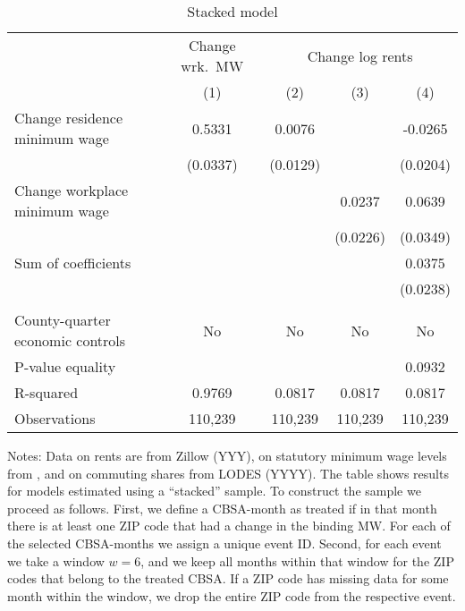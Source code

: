 \begin{table}[hbt!] \centering
	\caption{Stacked model}
	\label{tab:stacked_w6}
	\begin{tabular}{l*{4}{c}}
		\toprule
		& \multicolumn{1}{c}{Change wrk.\ MW}
		& \multicolumn{3}{c}{Change log rents}                            \\ \cmidrule(lr){2-2}\cmidrule(lr){3-5}
		                                   & (1)   & (2)   & (3)   & (4)      \\ \midrule
		Change residence minimum wage      &  0.5331  &  0.0076  &       &  -0.0265     \\
		                                   & (0.0337) & (0.0129) &       & (0.0204)    \\
		Change workplace minimum wage      &       &       &  0.0237  & 0.0639      \\
		                                   &       &       & (0.0226) & (0.0349)    \\ \midrule
		Sum of coefficients                &       &       &       &  0.0375     \\
		                                   &       &       &       & (0.0238)    \\
		                                   &       &       &       &          \\ \midrule
		County-quarter economic controls   &   No  & No    & No    & No       \\
		P-value equality                   &       &       &       & 0.0932      \\
		R-squared                          &  0.9769  &  0.0817  &  0.0817  & 0.0817      \\
		Observations                       & 110,239  & 110,239  & 110,239  & 110,239     \\\bottomrule
	\end{tabular}
    
    \begin{minipage}{.95\textwidth} \footnotesize
        \vspace{2mm}
        Notes: Data on rents are from Zillow (YYY), on statutory minimum wage levels
        from \textcite{VaghulZipperer2016, BerkeleyLaborCenter}, and on commuting 
        shares from LODES (YYYY).
        The table shows results for models estimated using a ``stacked'' sample.
        To construct the sample we proceed as follows.
        First, we define a CBSA-month as treated if in that month there is at least one ZIP 
        code that had a change in the binding MW.
        For each of the selected CBSA-months we assign a unique event ID. 
        Second, for each event we take a window $w = 6$, and we keep all months within that 
        window for the ZIP codes that belong to the treated CBSA.
        If a ZIP code has missing data for some month within the window, we drop the entire 
        ZIP code from the respective event. 
    \end{minipage}
\end{table}
